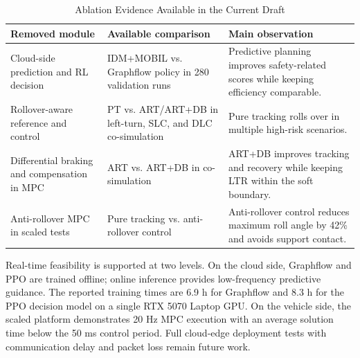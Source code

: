 \begin{table}[t]
  \centering
  \caption{Ablation Evidence Available in the Current Draft}
  \label{tab:ablation_plan}
  \begin{tabularx}{0.96\textwidth}{p{}p{}X}
    \toprule
    Removed module & Available comparison & Main observation \\
    \midrule
    Cloud-side prediction and RL decision & IDM+MOBIL vs. Graphflow policy in 280 validation runs & Predictive planning improves safety-related scores while keeping efficiency comparable. \\
    Rollover-aware reference and control & PT vs. ART/ART+DB in left-turn, SLC, and DLC co-simulation & Pure tracking rolls over in multiple high-risk scenarios. \\
    Differential braking and compensation in MPC & ART vs. ART+DB in co-simulation & ART+DB improves tracking and recovery while keeping LTR within the soft boundary. \\
    Anti-rollover MPC in scaled tests & Pure tracking vs. anti-rollover control & Anti-rollover control reduces maximum roll angle by 42\% and avoids support contact. \\
    \bottomrule
  \end{tabularx}
\end{table}

Real-time feasibility is supported at two levels. On the cloud side, Graphflow and PPO are trained offline; online inference provides low-frequency predictive guidance. The reported training times are 6.9 h for Graphflow and 8.3 h for the PPO decision model on a single RTX 5070 Laptop GPU. On the vehicle side, the scaled platform demonstrates 20 Hz MPC execution with an average solution time below the 50 ms control period. Full cloud-edge deployment tests with communication delay and packet loss remain future work.
